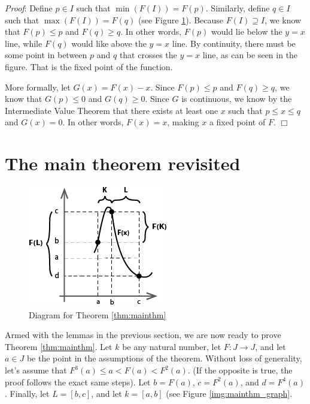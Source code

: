 \documentclass[12pt]{IEEEtran}
\begin{document}
{\it Proof}: Define $p \in I$ such that $\min \left( F \left( I \right) \right) = F \left( p \right)$. Similarly, define $q \in I$ such that $\max \left( F \left( I \right) \right) = F \left( q \right)$ (see Figure \ref{fig:fixedpoint_graph}). Because $F \left( I \right) \supseteq I$, we know that $F \left( p \right) \leq p$ and $F \left( q \right) \geq q$. In other words, $F \left( p \right)$ would lie below the $y=x$ line, while $F \left( q \right)$ would like above the $y=x$ line. By continuity, there must be some point in between $p$ and $q$ that crosses the $y=x$ line, as can be seen in the figure. That is the fixed point of the function.

More formally, let $G \left( x \right) = F \left( x \right) - x$. Since $F \left( p \right) \leq p$ and $F \left( q \right) \geq q$, we know that $G \left( p \right) \leq 0$ and $G \left( q \right) \geq 0$. Since $G$ is continuous, we know by the Intermediate Value Theorem that there exists at least one $x$ such that $p \leq x \leq q$ and $G \left( x \right) = 0$. In other words, $F \left(x \right) = x$, making $x$ a fixed point of $F$. $\Box$


\section{The main theorem revisited}

\begin{figure}
	\begin{center}
		\includegraphics{img/mainthm_graph.png}
		\caption{Diagram for Theorem \ref{thm:mainthm}}
        \label{fig:fixedpoint_graph}
	\end{center}
\end{figure}

Armed with the lemmas in the previous section, we are now ready to prove Theorem \ref{thm:mainthm}. Let $k$ be any natural number, let $F : J \rightarrow J$, and let $a \in J$ be the point in the assumptions of the theorem. Without loss of generality, let's assume that $F^3\left(a\right) \leq a < F\left(a\right) < F^2\left(a\right)$. (If the opposite is true, the proof follows the exact same steps). Let $b = F \left( a \right)$, $c = F ^2 \left( a \right)$, and $d = F^4  \left( a \right)$. Finally, let $L = \left[ b, c \right]$, and let $k = \left[ a,b \right]$ (see Figure \ref{img:mainthm_graph}.
\end{document}

